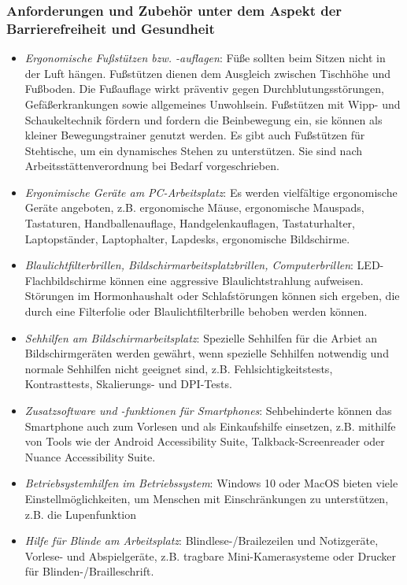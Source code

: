 \documentclass[a4paper, 12pt]{report}
\begin{document}
\begin{multicols}{2}
\subsubsection{Anforderungen und Zubehör unter dem Aspekt der Barrierefreiheit
und Gesundheit}

\begin{itemize}
    \item \emph{Ergonomische Fußstützen bzw. -auflagen}: Füße sollten beim
    Sitzen nicht in der Luft hängen. Fußstützen dienen dem Ausgleich zwischen
    Tischhöhe und Fußboden. Die Fußauflage wirkt präventiv gegen
    Durchblutungsstörungen, Gefäßerkrankungen sowie allgemeines Unwohlsein.
    Fußstützen mit Wipp- und Schaukeltechnik fördern und fordern die
    Beinbewegung ein, sie können als kleiner Bewegungstrainer genutzt werden.
    Es gibt auch Fußstützen für Stehtische, um ein dynamisches Stehen zu
    unterstützen. Sie sind nach Arbeitsstättenverordnung bei Bedarf
    vorgeschrieben.
    \item \emph{Ergonimische Geräte am PC-Arbeitsplatz}: Es werden vielfältige
    ergonomische Geräte angeboten, z.B. ergonomische Mäuse, ergonomische
    Mauspads, Tastaturen, Handballenauflage, Handgelenkauflagen, Tastaturhalter,
    Laptopständer, Laptophalter, Lapdesks, ergonomische Bildschirme.

    \item \emph{Blaulichtfilterbrillen, Bildschirmarbeitsplatzbrillen,
    Computerbrillen}: LED-Flachbildschirme können eine aggressive
    Blaulichtstrahlung aufweisen. Störungen im Hormonhaushalt oder
    Schlafstörungen können sich ergeben, die durch eine Filterfolie oder
    Blaulichtfilterbrille behoben werden können.
    \item \emph{Sehhilfen am Bildschirmarbeitsplatz}: Spezielle Sehhilfen für
    die Arbiet an Bildschirmgeräten werden gewährt, wenn spezielle Sehhilfen
    notwendig und normale Sehhilfen nicht geeignet sind, z.B.
    Fehlsichtigkeitstests, Kontrasttests, Skalierungs- und DPI-Tests.
    \item \emph{Zusatzsoftware und -funktionen für Smartphones}: Sehbehinderte
    können das Smartphone auch zum Vorlesen und als Einkaufshilfe einsetzen,
    z.B. mithilfe von Tools wie der Android Accessibility Suite,
    Talkback-Screenreader oder Nuance Accessibility Suite.
    \item \emph{Betriebsystemhilfen im Betriebssystem}: Windows 10 oder MacOS
    bieten viele Einstellmöglichkeiten, um Menschen mit Einschränkungen zu
    unterstützen, z.B. die Lupenfunktion
    \item \emph{Hilfe für Blinde am Arbeitsplatz}: Blindlese-/Brailezeilen und
    Notizgeräte, Vorlese- und Abspielgeräte, z.B. tragbare Mini-Kamerasysteme
    oder Drucker für Blinden-/Brailleschrift.
\end{itemize}


\end{multicols}
\end{document}
